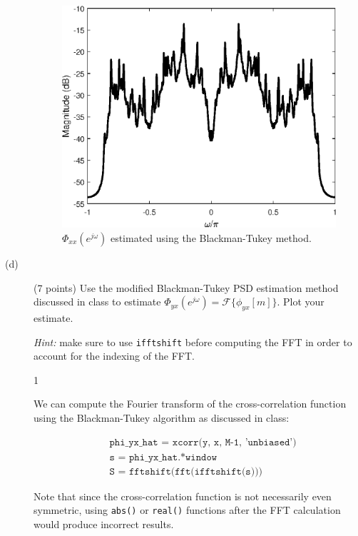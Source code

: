 \documentclass[10pt]{article}
\def\SOLUTIONS{1} %
\def\SolutionsColor{red2}
\begin{document}
\begin{description}
{		\FloatBarrier
		\begin{figure}[h!]
			\centering
			\includegraphics[scale=0.7]{figs/noise_cancel_x_psd.eps}
			\caption{$\Phi_{xx}(e^{j\omega})$ estimated using the Blackman-Tukey method.}
			\label{fig:noise_cancel_x_psd}
		\end{figure}
		\FloatBarrier
	}\fi
	
	\item[(d)] (7 points) Use the modified Blackman-Tukey PSD estimation method discussed in class to estimate $\Phi_{yx}(e^{j\omega}) = \mathcal{F}\{\phi_{yx}[m]\}$. Plot your estimate.

	\textit{Hint:} make sure to use \texttt{ifftshift} before computing the FFT in order to account for the indexing of the FFT.
	
	\if\SOLUTIONS1 {\color{\SolutionsColor} We can compute the Fourier transform of the cross-correlation function using the Blackman-Tukey algorithm as discussed in class:
		
		\begin{align*}
		&\texttt{phi\_yx\_hat = xcorr(y, x, M-1, 'unbiased')} \\
		&\texttt{s = phi\_yx\_hat.*window} \\
		&\texttt{S = fftshift(fft(ifftshift(s)))}
		\end{align*}
		
		Note that since the cross-correlation function is not necessarily even symmetric, using \texttt{abs()} or \texttt{real()} functions after the FFT calculation would produce incorrect results.
		
}
\end{description}
\end{document}
